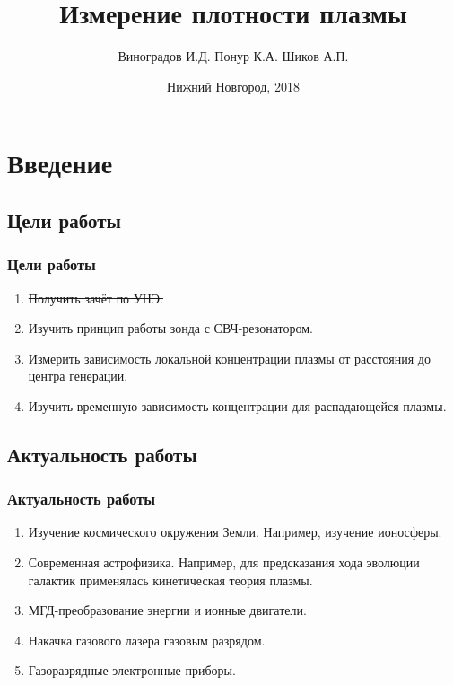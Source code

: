 \documentclass[10pt,pdf,hyperref={unicode}, dvipsnames]{beamer}
\title[Измерение плотности плазмы]{Измерение плотности плазмы}
\author{%
	Виноградов И.Д. %
	Понур К.А. %
	Шиков А.П. %
}
\institute{Радиофизический факультет ННГУ, 430 группа}
\date{Нижний Новгород, 2018}
\begin{document}
  
\begin{frame}
\titlepage
\end{frame}
\begin{frame}
\tableofcontents
\end{frame}
\section{Введение}
\subsection{Цели работы}
\begin{frame}[t]
	\frametitle{Цели работы}
		\vfill
		\begin{enumerate}
			\item \sout{Получить зачёт по УНЭ.}
			\item Изучить принцип работы зонда с СВЧ-резонатором.

			\item Измерить зависимость локальной концентрации плазмы			от расстояния до центра генерации.

			\item Изучить временную зависимость концентрации для распадающейся плазмы.

		\end{enumerate}
		\vfill
\end{frame}
\subsection{Актуальность работы}
\begin{frame}[t]
	
	\frametitle{Актуальность работы}
		\vfill
		\begin{enumerate}
			\item Изучение космического окружения Земли. Например, изучение ионосферы.
			\item Современная астрофизика. Например, для предсказания хода эволюции галактик применялась кинетическая теория плазмы.
			\item МГД-преобразование энергии и ионные двигатели.
			\item Накачка газового лазера газовым разрядом.
			\item Газоразрядные электронные приборы.
		\end{enumerate}


\end{frame}
\end{document}
